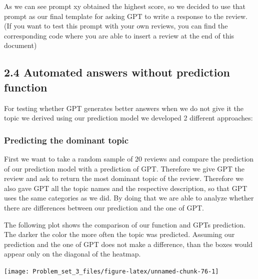 \documentclass[
]{article}
\begin{document}
As we can see prompt xy obtained the highest score, so we decided to use
that prompt as our final template for asking GPT to write a response to
the review. (If you want to test this prompt with your own reviews, you
can find the corresponding code where you are able to insert a review at
the end of this document)

\hypertarget{automated-answers-without-prediction-function}{%
\subsection{2.4 Automated answers without prediction
function}\label{automated-answers-without-prediction-function}}

For testing whether GPT generates better answers when we do not give it
the topic we derived using our prediction model we developed 2 different
approaches:

\hypertarget{predicting-the-dominant-topic}{%
\subsubsection{Predicting the dominant
topic}\label{predicting-the-dominant-topic}}

First we want to take a random sample of 20 reviews and compare the
prediction of our prediction model with a prediction of GPT. Therefore
we give GPT the review and ask to return the most dominant topic of the
review. Therefore we also gave GPT all the topic names and the
respective description, so that GPT uses the same categories as we did.
By doing that we are able to analyze whether there are differences
between our prediction and the one of GPT.

The following plot shows the comparison of our function and GPTs
prediction. The darker the color the more often the topic was predicted.
Assuming our prediction and the one of GPT does not make a difference,
than the boxes would appear only on the diagonal of the heatmap.

\begin{center}\texttt{[image: Problem\_set\_3\_files/figure-latex/unnamed-chunk-76-1]} \end{center}
\end{document}
